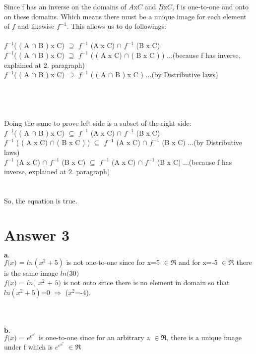 \documentclass[12pt]{article}
\begin{document}
Since f has an inverse on the domains of $\textit{A}$x$\textit{C}$ and $\textit{B}$x$\textit{C}$, f is one-to-one and onto on these domains. Which means there must be a unique image for each element of $\textit{f}$ and likewise $\textit{f}^{-1}$. This allows us to do followings:  
\\
\\
$\textit{f}^{-1}$( ( A $\cap$ B ) x C) $\supseteq$ $\textit{f}^{-1}$ (A x C) $\cap$ $\textit{f}^{-1}$ (B x C) \\
$\textit{f}^{-1}$( ( A $\cap$ B ) x C) $\supseteq$ $\textit{f}^{-1}$ ( ( A x C) $\cap$ ( B x C ) ) ...(because f has inverse, explained at 2. paragraph) \\
$\textit{f}^{-1}$( ( A $\cap$ B ) x C) $\supseteq$ $\textit{f}^{-1}$ ( ( A $\cap$ B ) x C ) ...(by Distributive laws)
\\
\\
\\
\\
\\
Doing the same to prove left side is a subset of the right side: \\
$\textit{f}^{-1}$( ( A $\cap$ B ) x C) $\subseteq$ $\textit{f}^{-1}$ (A x C) $\cap$ $\textit{f}^{-1}$ (B x C) \\
$\textit{f}^{-1}$ ( ( A x C) $\cap$ ( B x C ) ) $\subseteq$ $\textit{f}^{-1}$ (A x C) $\cap$ $\textit{f}^{-1}$ (B x C) ...(by Distributive laws)\\
$\textit{f}^{-1}$ (A x C) $\cap$ $\textit{f}^{-1}$ (B x C) $\subseteq$ $\textit{f}^{-1}$ (A x C) $\cap$ $\textit{f}^{-1}$ (B x C)  ...(because f has inverse, explained at 2. paragraph) \\
\\
\\
So, the equation is true.



\section*{Answer 3}

$\textbf{a.}$
\\
$\textit{f(x)}$ = $\textit{$ln( x^{2} + 5)$}$ is not one-to-one since for x=5 $\in\Re$ and for x=-5 $\in\Re$ there is the same image $\textit{ln(30)}$
\\

$\textit{f(x)}$ = $\textit{ln( $x^{2}$ + 5)}$ is not onto since there is no element in domain so that $\textit{$ln( x^{2} + 5)$}$=0 $\Rightarrow$ ($x^{2}$=-4).
\\ \\ \\ \\
$\textbf{b.}$ 
\\
$\textit{f(x)}$ = $e^{e^{x^{7}}}$ is one-to-one since for an arbitrary a $\in\Re$, there is a unique image under f which is $e^{e^{a^{7}}}$ $\in\Re$ \\
\end{document}
